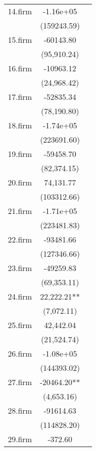 {\begin{tabular}{l*{2}{c}}
14.firm     &   -1.16e+05  &              \\
            & (159243.59)  &              \\
15.firm     &   -60143.80  &              \\
            & (95,910.24)  &              \\
16.firm     &   -10963.12  &              \\
            & (24,968.42)  &              \\
17.firm     &   -52835.34  &              \\
            & (78,190.80)  &              \\
18.firm     &   -1.74e+05  &              \\
            & (223691.60)  &              \\
19.firm     &   -59458.70  &              \\
            & (82,374.15)  &              \\
20.firm     &   74,131.77  &              \\
            & (103312.66)  &              \\
21.firm     &   -1.71e+05  &              \\
            & (223481.83)  &              \\
22.firm     &   -93481.66  &              \\
            & (127346.66)  &              \\
23.firm     &   -49259.83  &              \\
            & (69,353.11)  &              \\
24.firm     &   22,222.21**&              \\
            &  (7,072.11)  &              \\
25.firm     &   42,442.04  &              \\
            & (21,524.74)  &              \\
26.firm     &   -1.08e+05  &              \\
            & (144393.02)  &              \\
27.firm     &   -20464.20**&              \\
            &  (4,653.16)  &              \\
28.firm     &   -91614.63  &              \\
            & (114828.20)  &              \\
29.firm     &     -372.60  &              \\

\end{tabular}}
